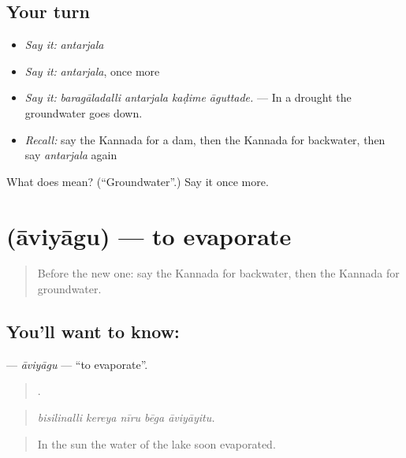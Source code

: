 \subsection*{Your turn}
\begin{itemize}
\raggedright
  \item \emph{Say it:} \emph{antarjala}
  \item \emph{Say it:} \emph{antarjala}, once more
  \item \emph{Say it:} \emph{baragāladalli antarjala kaḍime āguttade.} — In a drought the groundwater goes down.
  \item \emph{Recall:} say the Kannada for a dam, then the Kannada for backwater, then say \emph{antarjala} again
\end{itemize}

\begin{tcolorbox}[breakable,colback=teal!4,colframe=teal!35!black,title={Before you move on}]
What does  mean? (\textquotedblleft{}Groundwater\textquotedblright{}.) Say it once more.
\end{tcolorbox}
\section[\texorpdfstring{\kn{ಆವಿಯಾಗು} (āviyāgu)}{ಆವಿಯಾಗು (āviyāgu)}]{ (āviyāgu) — to evaporate}

\label{lesson:KA-C483-aviyagu}



\begin{quote}
Before the new one: say the Kannada for backwater, then the Kannada for groundwater.
\end{quote}

\subsection*{You'll want to know: }
\textbf{} — \emph{āviyāgu} — \textquotedblleft{}to evaporate\textquotedblright{}.

\begin{quote}
    .
\end{quote}

\begin{quote}
\emph{bisilinalli kereya nīru bēga āviyāyitu.}
\end{quote}

\begin{quote}
In the sun the water of the lake soon evaporated.
\end{quote}

